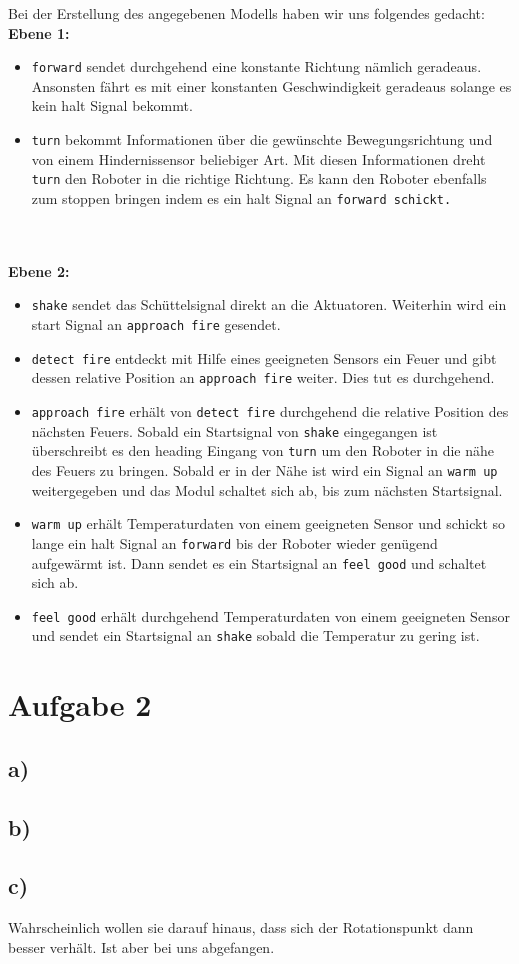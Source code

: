 \documentclass{../Vorlage/mat}
\begin{document}
Bei der Erstellung des angegebenen Modells haben wir uns folgendes gedacht:\\
\textbf{Ebene 1:}\\
\begin{itemize}
	\item \texttt{forward} sendet durchgehend eine konstante Richtung nämlich geradeaus. Ansonsten fährt es mit einer konstanten Geschwindigkeit geradeaus solange es kein halt Signal bekommt.
	\item \texttt{turn} bekommt Informationen über die gewünschte Bewegungsrichtung und von einem Hindernissensor beliebiger Art. Mit diesen Informationen dreht \texttt{turn} den Roboter in die richtige Richtung. Es kann den Roboter ebenfalls zum stoppen bringen indem es ein halt Signal an \texttt{forward schickt.}
\end{itemize}\\
\\
\textbf{Ebene 2:}
\begin{itemize}
	\item \texttt{shake} sendet das Schüttelsignal direkt an die Aktuatoren. Weiterhin wird ein start Signal an \texttt{approach fire} gesendet.
	\item \texttt{detect fire} entdeckt mit Hilfe eines geeigneten Sensors ein Feuer und gibt dessen relative Position an \texttt{approach fire} weiter. Dies tut es durchgehend.
	\item \texttt{approach fire} erhält von \texttt{detect fire} durchgehend die relative Position des nächsten Feuers. Sobald ein Startsignal von \texttt{shake} eingegangen ist überschreibt es den heading Eingang von \texttt{turn} um den Roboter in die nähe des Feuers zu bringen. Sobald er in der Nähe ist wird ein Signal an \texttt{warm up} weitergegeben und das Modul schaltet sich ab, bis zum nächsten Startsignal.
	\item \texttt{warm up} erhält Temperaturdaten von einem geeigneten Sensor und schickt so lange ein halt Signal an \texttt{forward} bis der Roboter wieder genügend aufgewärmt ist. Dann sendet es ein Startsignal an \texttt{feel good} und schaltet sich ab.
	\item \texttt{feel good} erhält durchgehend Temperaturdaten von einem geeigneten Sensor und sendet ein Startsignal an \texttt{shake} sobald die Temperatur zu gering ist.
\end{itemize}


\section*{Aufgabe 2}
\subsection*{a)}
\subsection*{b)}
\subsection*{c)}
Wahrscheinlich wollen sie darauf hinaus, dass sich der Rotationspunkt dann besser verhält. Ist aber bei uns abgefangen.
\end{document}
